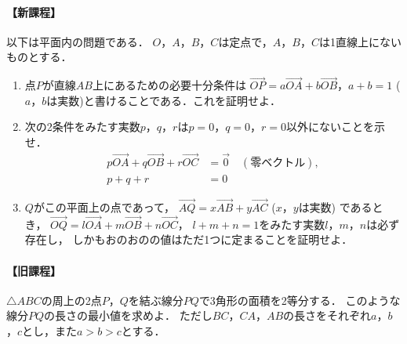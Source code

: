 \documentclass[../../main.tex]{subfiles}
\begin{document}
\paragraph{【新課程】}
以下は平面内の問題である．
$O$，$A$，$B$，$C$は定点で，$A$，$B$，$C$は1直線上にないものとする．
\begin{enumerate}
  \item 点$P$が直線$AB$上にあるための必要十分条件は
    $\overrightarrow{OP}=a\overrightarrow{OA}+b\overrightarrow{OB}$，$a+b=1$
    ($a$，$b$は実数)と書けることである．これを証明せよ．
  \item 次の2条件をみたす実数$p$，$q$，$r$は$p=0$，$q=0$，$r=0$以外にないことを示せ．
    \begin{align}
      p\overrightarrow{OA}+q\overrightarrow{OB}+r\overrightarrow{OC}&=\vec{0} \quad (\text{零ベクトル}), \\
      p+q+r&=0
    \end{align}
  \item $Q$がこの平面上の点であって，
    $\overrightarrow{AQ}=x\overrightarrow{AB}+y\overrightarrow{AC}$ ($x$，$y$は実数)
    であるとき，
    $\overrightarrow{OQ}=l\overrightarrow{OA}+m\overrightarrow{OB}+n\overrightarrow{OC}$，
    $l+m+n=1$をみたす実数$l$，$m$，$n$は必ず存在し，
    しかもおのおのの値はただ1つに定まることを証明せよ．
\end{enumerate}

\paragraph{【旧課程】}
$\triangle ABC$の周上の2点$P$，$Q$を結ぶ線分$PQ$で3角形の面積を2等分する．
このような線分$PQ$の長さの最小値を求めよ．
ただし$BC$，$CA$，$AB$の長さをそれぞれ$a$，$b$，$c$とし，また$a>b>c$とする．
\end{document}
